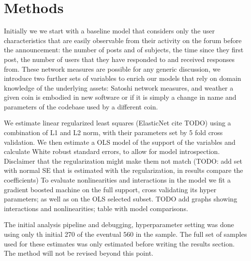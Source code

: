 
\section{Methods }

Initially we we start with a baseline model that considers only the user characteristics that are easily observable from their activity on the forum before the announcement: the number of posts and of subjects,  the time since they first post, the number of users that they have responded to and received responses from. 
These network measures are possible for any generic discussion, we introduce two further sets of variables to enrich our models that rely on domain knowledge of the underlying assets: Satoshi network measures, and weather a given coin is embodied in new software or if it is simply a change in name and parameters of the codebase used by a different coin.

We estimate linear regularized least squares (ElasticNet cite TODO) using a combination of L1 and L2 norm, with their parameters set by 5 fold cross validation. 
We then estimate a OLS model of the support of the variables and calculate White robust standard errors, to allow for model introspection. 
Disclaimer that the regularization might make them not match (TODO: add set with normal SE that is estimated with the regularization, in results compare the coefficients) 
To evaluate nonlinearities and interactions  in the model we fit a gradient boosted machine on the full support, cross validating its hyper parameters; as well as on the OLS selected subset.  TODO add graphs showing interactions and nonlinearities; table with model comparisons.


The initial analysis pipeline and debugging, hyperparameter setting was done using only th initial 270 of the eventual 560 in the sample. The full set of samples used for these estimates was only estimated before writing the results section. The method will not be revised beyond this point.

